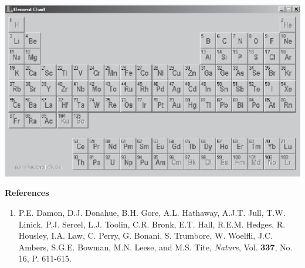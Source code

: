 \begin{center}
\includegraphics[width=5.5in]{radiocarbon_dating/pertable3_bw.eps}
\end{center}

\textbf{References}

\begin{enumerate}
\item P.E. Damon, D.J. Donahue, B.H. Gore, A.L. Hathaway, A.J.T. Jull, T.W. Linick,
P.J. Sercel, L.J. Toolin, C.R. Bronk, E.T. Hall, R.E.M. Hedges, R. Housley,
I.A. Law, C. Perry, G. Bonani, S. Trumbore, W. Woelfli, J.C. Ambers, S.G.E. Bowman,
M.N. Leese, and M.S. Tite, \emph{Nature}, Vol. \textbf{337}, No. 16,
P. 611-615.\end{enumerate}

